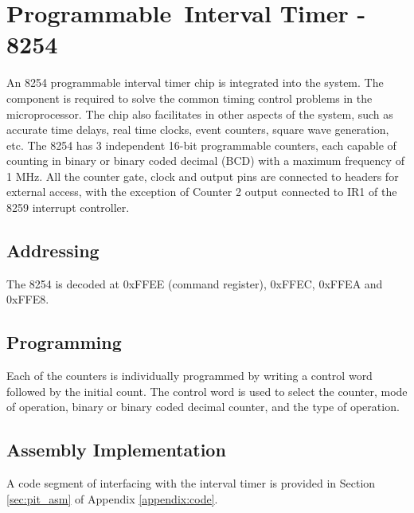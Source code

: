 \section{Programmable Interval Timer - 8254}
An 8254 programmable interval timer chip is integrated into the system. The component is required to solve the common timing control problems in the microprocessor. The chip also facilitates in other aspects of the system, such as accurate time delays, real time clocks, event counters, square wave generation, etc. The 8254 has 3 independent 16-bit programmable counters, each capable of counting in binary or binary coded decimal (BCD) with a maximum frequency of 1 MHz.\n
All the counter gate, clock and output pins are connected to headers for external access, with the exception of Counter 2 output connected to IR1 of the 8259 interrupt controller.

    \subsection{Addressing}
    The 8254 is decoded at 0xFFEE (command register), 0xFFEC, 0xFFEA and 0xFFE8.

    \subsection{Programming}
    Each of the counters is individually programmed by writing a control word followed by the initial count. The control word is used to select the counter, mode of operation, binary or binary coded decimal counter, and the type of operation.

    \subsection{Assembly Implementation}
    A code segment of interfacing with the interval timer is provided in Section \ref{sec:pit_asm} of Appendix \ref{appendix:code}.
